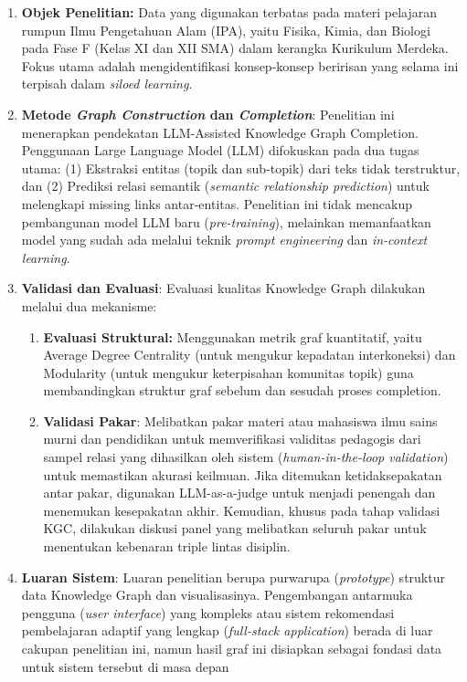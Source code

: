 \documentclass[
]{article}
\begin{document}
\begin{enumerate}
\def\labelenumi{\arabic{enumi}.}
\item
  \textbf{Objek Penelitian:} Data yang digunakan terbatas pada materi
  pelajaran rumpun Ilmu Pengetahuan Alam (IPA), yaitu Fisika, Kimia, dan
  Biologi pada Fase F (Kelas XI dan XII SMA) dalam kerangka Kurikulum
  Merdeka. Fokus utama adalah mengidentifikasi konsep-konsep beririsan
  yang selama ini terpisah dalam \emph{siloed learning}.
\item
  \textbf{Metode \emph{Graph Construction} dan \emph{Completion}}:
  Penelitian ini menerapkan pendekatan LLM-Assisted Knowledge Graph
  Completion. Penggunaan Large Language Model (LLM) difokuskan pada dua
  tugas utama: (1) Ekstraksi entitas (topik dan sub-topik) dari teks
  tidak terstruktur, dan (2) Prediksi relasi semantik (\emph{semantic
  relationship prediction}) untuk melengkapi missing links
  antar-entitas. Penelitian ini tidak mencakup pembangunan model LLM
  baru (\emph{pre-training}), melainkan memanfaatkan model yang sudah
  ada melalui teknik \emph{prompt engineering} dan \emph{in-context
  learning}.
\item
  \textbf{Validasi dan Evaluasi}: Evaluasi kualitas Knowledge Graph
  dilakukan melalui dua mekanisme:

  \begin{enumerate}
  \def\labelenumii{\alph{enumii}.}
  \item
    \textbf{Evaluasi Struktural:} Menggunakan metrik graf kuantitatif,
    yaitu Average Degree Centrality (untuk mengukur kepadatan
    interkoneksi) dan Modularity (untuk mengukur keterpisahan komunitas
    topik) guna membandingkan struktur graf sebelum dan sesudah proses
    completion.
  \item
    \textbf{Validasi Pakar}: Melibatkan pakar materi atau mahasiswa ilmu
    sains murni dan pendidikan untuk memverifikasi validitas pedagogis
    dari sampel relasi yang dihasilkan oleh sistem
    (\emph{human-in-the-loop validation}) untuk memastikan akurasi
    keilmuan. Jika ditemukan ketidaksepakatan antar pakar, digunakan
    LLM-as-a-judge untuk menjadi penengah dan menemukan kesepakatan
    akhir. Kemudian, khusus pada tahap validasi KGC, dilakukan diskusi
    panel yang melibatkan seluruh pakar untuk menentukan kebenaran
    triple lintas disiplin.
  \end{enumerate}
\item
  \textbf{Luaran Sistem}: Luaran penelitian berupa purwarupa
  (\emph{prototype}) struktur data Knowledge Graph dan visualisasinya.
  Pengembangan antarmuka pengguna (\emph{user interface}) yang kompleks
  atau sistem rekomendasi pembelajaran adaptif yang lengkap
  (\emph{full-stack application}) berada di luar cakupan penelitian ini,
  namun hasil graf ini disiapkan sebagai fondasi data untuk sistem
  tersebut di masa depan
\end{enumerate}
\end{document}
